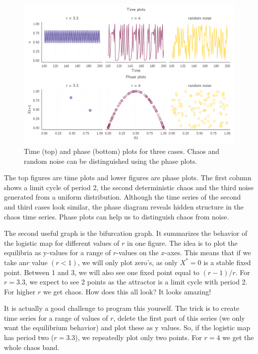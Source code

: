 \documentclass[
  a4paper,
  DIV=11,
  numbers=noendperiod,
  oneside]{scrreprt}
\begin{document}
\begin{figure}

{\centering \includegraphics{media/ch2/fig-ch2-img7.jpg}

}

\caption{\label{fig-ch2-img7}Time (top) and phase (bottom) plots for
three cases. Chaos and random noise can be distinguished using the phase
plots.}

\end{figure}

The top figures are time plots and lower figures are phase plots. The
first column shows a limit cycle of period 2, the second deterministic
chaos and the third noise generated from a uniform distribution.
Although the time series of the second and third cases look similar, the
phase diagram reveals hidden structure in the chaos time series. Phase
plots can help us to distinguish chaos from noise.

The second useful graph is the bifurcation graph. It summarizes the
behavior of the logistic map for different values of \(r\) in one
figure. The idea is to plot the equilibria as y-values for a range of
\(r\)-values on the \(x\)-axes. This means that if we take an\(r\) value
\((r < 1)\), we will only plot zero's, as only \(X^{*} = 0\) is a stable
fixed point. Between 1 and 3, we will also see one fixed point equal to
\((r - 1)/r\). For \(r = 3.3\), we expect to see 2 points as the
attractor is a limit cycle with period 2. For higher \(r\) we get chaos.
How does this all look? It looks amazing!

It is actually a good challenge to program this yourself. The trick is
to create time series for a range of values of \(r\), delete the first
part of this series (we only want the equilibrium behavior) and plot
these as y values. So, if the logistic map has period two (\(r = 3.3\)),
we repeatedly plot only two points. For \(r = 4\) we get the whole chaos
band.
\end{document}
